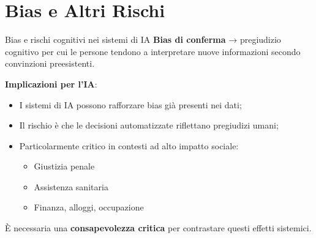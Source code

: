 \documentclass{beamer}
\begin{document}
\section{Bias e Altri Rischi}
%
%
\begin{frame}{Bias e rischi cognitivi nei sistemi di IA}
\small
\textbf{Bias di conferma} → pregiudizio cognitivo per cui le persone tendono a interpretare nuove informazioni secondo convinzioni preesistenti.

\vspace{0.3cm}
\textbf{Implicazioni per l’IA}:
\begin{itemize}
    \item I sistemi di IA possono rafforzare bias già presenti nei dati;
    \item Il rischio è che le decisioni automatizzate riflettano pregiudizi umani;
    \item Particolarmente critico in contesti ad alto impatto sociale:
    \begin{itemize}
        \item Giustizia penale
        \item Assistenza sanitaria
        \item Finanza, alloggi, occupazione
    \end{itemize}
\end{itemize}

\vspace{0.2cm}
È necessaria una \textbf{consapevolezza critica} per contrastare questi effetti sistemici.
\end{frame}
%
%
\end{document}
